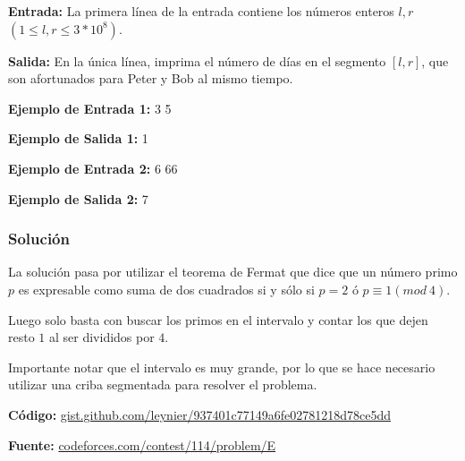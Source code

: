 \documentclass[12pt]{article}
\newcommand{\nl}{\vspace{0.3cm}}
\begin{document}
\nl

\textbf{Entrada:} La primera línea de la entrada contiene los números enteros $l, r$ $(1 \leqslant l, r \leqslant 3 * 10^8)$.

\nl

\textbf{Salida:} En la única línea, imprima el número de días en el segmento $[l, r]$, que son afortunados para Peter y Bob al mismo tiempo.

\nl

\textbf{Ejemplo de Entrada 1:} 3 5

\nl

\textbf{Ejemplo de Salida 1:} 1

\nl

\textbf{Ejemplo de Entrada 2:} 6 66

\nl

\textbf{Ejemplo de Salida 2:} 7

\nl

\subsubsection{Solución}

La solución pasa por utilizar el teorema de Fermat\cite{oftst} que dice que un número primo $p$ es expresable como suma de dos cuadrados si y sólo si $p = 2$ ó $p \equiv 1 (mod\ 4)$.

\nl

Luego solo basta con buscar los primos en el intervalo y contar los que dejen resto $1$ al ser divididos por $4$.

\nl

Importante notar que el intervalo es muy grande, por lo que se hace necesario utilizar una criba segmentada para resolver el problema.

\nl

\textbf{Código:} \href{https://gist.github.com/leynier/937401c77149a6fe02781218d78ce5dd}{gist.github.com/leynier/937401c77149a6fe02781218d78ce5dd}

\nl

\textbf{Fuente:} \href{https://codeforces.com/contest/114/problem/E}{codeforces.com/contest/114/problem/E}

\nl

\nocite{*}


\end{document}
